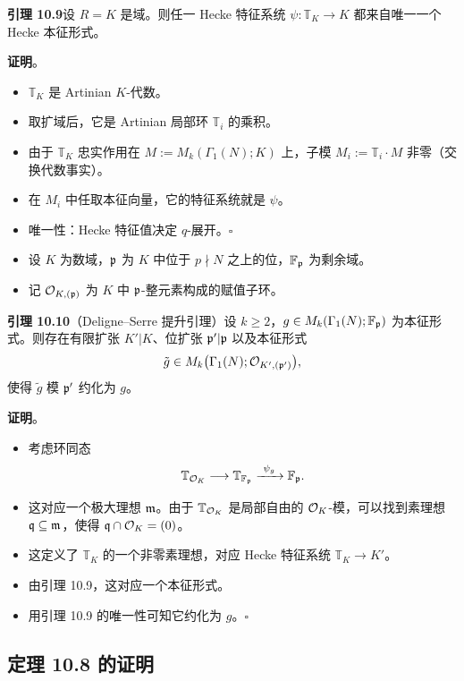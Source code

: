 \noindent\textbf{引理 10.9}\label{lem:10.9}\quad 设 $R=K$ 是域。则任一 Hecke 特征系统 $\psi:\mathbb{T}_K\to K$ 都来自唯一一个 Hecke 本征形式。

\noindent\textbf{证明}。
\begin{itemize}
\item $\mathbb{T}_K$ 是 Artinian $K$-代数。
\item 取扩域后，它是 Artinian 局部环 $\mathbb{T}_i$ 的乘积。
\item 由于 $\mathbb{T}_K$ 忠实作用在 $M:=M_k(\Gamma_1(N);K)$ 上，子模 $M_i:=\mathbb{T}_i\cdot M$ 非零（交换代数事实）。
\item 在 $M_i$ 中任取本征向量，它的特征系统就是 $\psi$。
\item 唯一性：Hecke 特征值决定 $q$-展开。\hfill$\square$
\end{itemize}

\begin{itemize}
\item 设 $K$ 为数域，$\mathfrak{p}$ 为 $K$ 中位于 $p\nmid N$ 之上的位，$\mathbb{F}_{\mathfrak{p}}$ 为剩余域。
\item 记 $\mathcal{O}_{K,(\mathfrak{p})}$ 为 $K$ 中 $\mathfrak{p}$-整元素构成的赋值子环。
\end{itemize}

\noindent\textbf{引理 10.10}（Deligne--Serre 提升引理）\label{lem:10.10}\quad 设 $k\ge 2$，$g\in M_k(\Gamma_1(N);\mathbb{F}_{\mathfrak{p}})$ 为本征形式。则存在有限扩张 $K'|K$、位扩张 $\mathfrak{p}'|\mathfrak{p}$ 以及本征形式
\[
\tilde g\in M_k\bigl(\Gamma_1(N);\mathcal{O}_{K',(\mathfrak{p}')}\bigr),
\]
使得 $\tilde g$ 模 $\mathfrak{p}'$ 约化为 $g$。

\noindent\textbf{证明}。
\begin{itemize}
\item 考虑环同态
\[
\mathbb{T}_{\OO_K}\longrightarrow\mathbb{T}_{\F_{\p}}\xrightarrow{\ \psi_g\ }\F_{\p}.
\]
\item 这对应一个极大理想 $\mathfrak{m}$。由于 $\mathbb{T}_{\mathcal{O}_K}$ 是局部自由的 $\mathcal{O}_K$-模，可以找到素理想 $\mathfrak{q}\subseteq\mathfrak{m}$，使得 $\mathfrak{q}\cap\mathcal{O}_K=(0)$。
\item 这定义了 $\mathbb{T}_K$ 的一个非零素理想，对应 Hecke 特征系统 $\mathbb{T}_K\to K'$。
\item 由引理 10.9，这对应一个本征形式。
\item 用引理 10.9 的唯一性可知它约化为 $g$。\hfill$\square$
\end{itemize}
\subsection*{定理 10.8 的证明}

